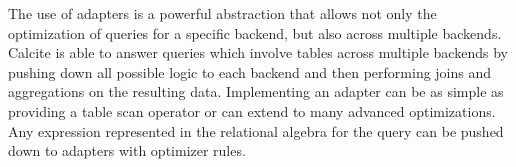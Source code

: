 The use of adapters is a powerful abstraction that allows not only the optimization of queries for a specific backend, but also across multiple backends.
Calcite is able to answer queries which involve tables across multiple backends by pushing down all possible logic to each backend and then performing joins and aggregations on the resulting data.
Implementing an adapter can be as simple as providing a table scan operator or can extend to many advanced optimizations.
Any expression represented in the relational algebra for the query can be pushed down to adapters with optimizer rules.
